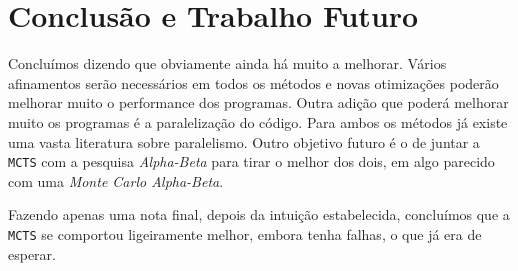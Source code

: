 \documentclass[12pt,a4paper,oneside]{article}
\begin{document}
\section{Conclusão e Trabalho Futuro}
\label{sec:conc}


Concluímos dizendo que obviamente ainda há muito a melhorar. Vários
afinamentos serão necessários em todos os métodos e novas otimizações
poderão melhorar muito o performance dos programas. Outra adição que
poderá melhorar muito os programas é a paralelização do código. Para
ambos os métodos já existe uma vasta literatura sobre
paralelismo. Outro objetivo futuro é o de juntar a \texttt{MCTS} com a
pesquisa \textit{Alpha-Beta} para tirar o melhor dos dois, em algo
parecido com uma \textit{Monte Carlo Alpha-Beta}.

Fazendo apenas uma nota final, depois da intuição estabelecida,
concluímos que a \texttt{MCTS} se comportou ligeiramente melhor,
embora tenha falhas, o que já era de esperar.



\end{document}
